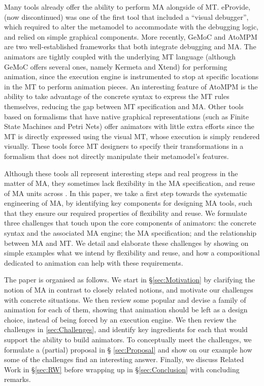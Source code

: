 Many \DSL tools already offer the ability to perform MA alongside of MT. eProvide,
\citep{Sadilek-Wachsmuth:2008} (now discontinued) was one of the first tool that
included a ``visual debugger'', which required to alter the \DSL metamodel to 
accommodate with the debugging logic, and relied on simple graphical components.
More recently, GeMoC \citep{combemale2016tool} and AtoMPM \cite{Syriani-Vangheluwe-etAl:2013}
are two well-established \DSL frameworks that both integrate debugging and MA. 
The animators are tightly coupled with the underlying MT language (although GeMoC
offers several ones, namely Kermeta and Xtend) for performing animation, since the
execution engine is instrumented to stop at specific locations in the MT to perform
animation pieces. An interesting feature of AtoMPM is the ability to take advantage
of the concrete syntax to express the MT rules themselves, reducing the gap between
MT specification and MA. Other tools based on formalisms that have native graphical
representations (such as Finite State Machines and Petri Nets) offer animators
with little extra efforts since the MT is directly expressed using the visual MT,
whose execution is simply rendered visually. These tools force MT designers to 
specify their transformations in a formalism that does not directly manipulate their
metamodel's features. 

Although these tools all represent interesting steps and real progress in the matter
of MA, they sometimes lack flexibility in the MA specification, and reuse of MA
units across \DSLs. 
In this paper, we take a first step towards the systematic engineering of MA, by
identifying key components for designing MA tools, such that they ensure our
required properties of flexibility and reuse. We formulate three challenges that
touch upon the core components of animators: the concrete syntax and the associated
MA engine; the MA specification; and the relationship between MA and MT.
We detail and elaborate these challenges by showing on simple examples what we
intend by flexibility and reuse, and how a compositional \DSL dedicated to animation
can help with these requirements. 

The paper is organised as follows. We start in \S \ref{sec:Motivation} by clarifying
the notion of MA in contrast to closely related notions, and motivate our challenges
with concrete situations. We then review some popular \DSLs and devise a family
of animation for each of them, showing that animation should be left as a design
choice, instead of being forced by an execution engine. We then review the challenges
in \ref{sec:Challenges}, and identify key ingredients for each that would support
the ability to build animators.
To conceptually meet the challenges, we formulate a (partial) proposal in \S 
\ref{sec:Proposal} and show on our example \DSLs how some of the challenges find
an interesting answer. Finally, we discuss Related Work in \S \ref{sec:RW} before
wrapping up in \S \ref{sec:Conclusion} with concluding remarks.
